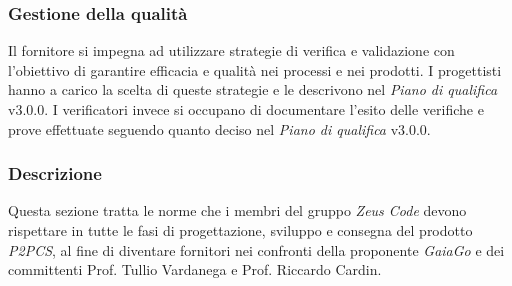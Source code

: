 	\subsubsection{Gestione della qualità}
	Il fornitore si impegna ad utilizzare strategie di verifica e validazione con l'obiettivo di garantire efficacia e qualità nei processi e nei prodotti. I progettisti hanno a carico la scelta di queste strategie e le descrivono nel \textit{Piano di qualifica} v3.0.0. I verificatori invece si occupano di documentare l'esito delle verifiche e prove effettuate seguendo quanto deciso nel \textit{Piano di qualifica} v3.0.0.
	\subsubsection{Descrizione}
	Questa sezione tratta le norme che i membri del gruppo \textit{Zeus Code} devono rispettare in tutte le fasi di progettazione, sviluppo e consegna del prodotto \textit{P2PCS}, al fine di diventare fornitori nei confronti della proponente \textit{GaiaGo} e dei committenti Prof. Tullio Vardanega e Prof. Riccardo Cardin.
